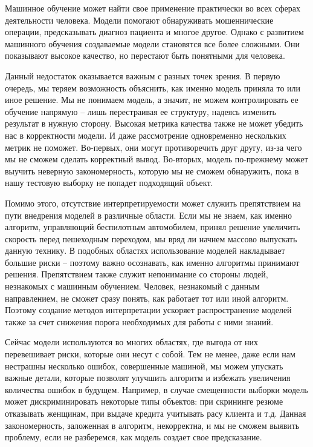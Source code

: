 Машинное обучение может найти свое применение практически во всех сферах деятельности человека. Модели помогают обнаруживать мошеннические операции, предсказывать диагноз пациента и многое другое. Однако с развитием машинного обучения создаваемые модели становятся все более сложными. Они показывают высокое качество, но перестают быть понятными для человека.

Данный недостаток оказывается важным с разных точек зрения. В первую очередь, мы теряем возможность объяснить, как именно модель приняла то или иное решение. Мы не понимаем модель, а значит, не можем контролировать ее обучение напрямую -- лишь перестраивая ее структуру, надеясь изменить результат в нужную сторону. Высокая метрика качества также не может убедить нас в корректности модели. И даже рассмотрение одновременно нескольких метрик не поможет. Во-первых, они могут противоречить друг другу, из-за чего мы не сможем сделать корректный вывод. Во-вторых, модель по-прежнему может выучить неверную закономерность, которую мы не сможем обнаружить, пока в нашу тестовую выборку не попадет подходящий объект.

Помимо этого, отсутствие интерпретируемости может служить препятствием на пути внедрения моделей в различные области. Если мы не знаем, как именно алгоритм, управляющий беспилотным автомобилем, принял решение увеличить скорость перед пешеходным переходом, мы вряд ли начнем массово выпускать данную технику. В подобных областях использование моделей накладывает большие риски -- поэтому важно осознавать, как именно алгоритмы принимают решения. Препятствием также служит непонимание со стороны людей, незнакомых с машинным обучением. Человек, незнакомый с данным направлением, не сможет сразу понять, как работает тот или иной алгоритм. Поэтому создание методов интерпретации ускоряет распространение моделей также за счет снижения порога необходимых для работы с ними знаний.

Сейчас модели используются во многих областях, где выгода от них перевешивает риски, которые они несут с собой. Тем не менее, даже если нам нестрашны несколько ошибок, совершенные машиной, мы можем упускать важные детали, которые позволят улучшить алгоритм и избежать увеличения количества ошибок в будущем. Например, в случае смещенности выборки модель может дискриминировать некоторые типы объектов: при скрининге резюме отказывать женщинам, при выдаче кредита учитывать расу клиента и т.д. Данная закономерность, заложенная в алгоритм, некорректна, и мы не сможем выявить проблему, если не разберемся, как модель создает свое предсказание.

